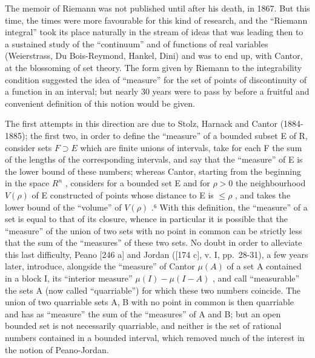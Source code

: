 The memoir of Riemann was not published until after his death, in 1867. But this time, the times were more favourable for this kind of research, and the ``Riemann integral'' took its place naturally in the stream of ideas that was leading then to a sustained study of the ``continuum'' and of functions of real variables (Weierstrass, Du Bois-Reymond, Hankel, Dini) and was to end up, with Cantor, at the blossoming of set theory. The form given by Riemann to the integrability condition suggested the idea of ``measure'' for the set of points of discontinuity of a function in an interval; but nearly 30 years were to pass by before a fruitful and convenient definition of this notion would be given.

The first attempts in this direction are due to Stolz, Harnack and Cantor (1884-1885); the first two, in order to define the ``measure'' of a bounded subset E of R, consider sets \(F \supset E\) which are finite unions of intervals, take for each F the sum of the lengths of the corresponding intervals, and say that the ``measure'' of E is the lower bound of these numbers; whereas Cantor, starting from the beginning in the space \(R^{n}\) , considers for a bounded set E and for \(\rho > 0\) the neighbourhood \(V(\rho)\) of E constructed of points whose distance to E is \(\leq \rho\) , and takes the lower bound of the ``volume'' of \(V(\rho)\) .⁶ With this definition, the ``measure'' of a set is equal to that of its closure, whence in particular it is possible that the ``measure'' of the union of two sets with no point in common can be strictly less that the sum of the ``measures'' of these two sets. No doubt in order to alleviate this last difficulty, Peano {[}246 a{]} and Jordan ({[}174 c{]}, v. I, pp.~28-31), a few years later, introduce, alongside the ``measure'' of Cantor \(\mu(A)\) of a set A contained in a block I, its ``interior measure'' \(\mu(I) - \mu(I - A)\) , and call ``measurable'' the sets A (now called ``quarriable'') for which these two numbers coincide. The union of two quarriable sets A, B with no point in common is then quarriable and has as ``measure'' the sum of the ``measures'' of A and B; but an open bounded set is not necessarily quarriable, and neither is the set of rational numbers contained in a bounded interval, which removed much of the interest in the notion of Peano-Jordan.

